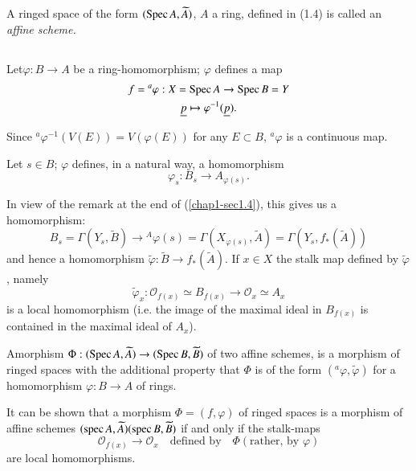 A ringed space of the form $(\operatorname{Spec} A,\widetilde{A})$, $A$ a ring,
defined in (1.4) is called an {\em affine scheme.}

\subsection{}\label{chap1-sec1.6.1}%

Let\pageoriginale $\varphi:B\to A$ be a ring-homomorphism; $\varphi$
defines a map
\begin{gather*}
f={}^{a}\varphi:X=\operatorname{Spec} A\to \operatorname{Spec} B=Y\\
\underline{p}\mapsto \varphi^{-1}(\underline{p}).
\end{gather*}

Since ${}^{a}\varphi^{-1}(V(E))=V(\varphi(E))$ for any $E\subset B$,
${}^{a}\varphi$ is a continuous map.

Let $s\in B$; $\varphi$ defines, in a natural way, a homomorphism
$$
\varphi_{s}:B_{s}\to A_{\varphi(s)}.
$$

In view of the remark at the end of (\ref{chap1-sec1.4}), this gives
us a homomorphism:
$$
B_{s}=\Gamma(Y_{s},\widetilde{B})\to
{}^{A}\varphi(s)=\Gamma(X_{\varphi(s)},\widetilde{A})=\Gamma(Y_{s},f_{\ast}(\widetilde{A})) 
$$
and hence a homomorphism $\widetilde{\varphi}:\widetilde{B}\to
f_{\ast}(\widetilde{A})$. If $x\in X$ the stalk map defined by
$\widetilde{\varphi}$, namely
$$
\widetilde{\varphi}_{x}:\mathscr{O}_{f(x)}\simeq B_{f(x)}\to
\mathscr{O}_{x}\simeq A_{x}
$$
is a local homomorphism (i.e. the image of the maximal ideal in
$B_{f(x)}$ is contained in the maximal ideal of $A_{x}$).

\setcounter{defin}{1}
\begin{defin}\label{chap1-def1.6.2}
A\pageoriginale morphism $\Phi:(\operatorname{Spec} A,\widetilde{A})\to (\operatorname{Spec}
B,\widetilde{B})$ of two affine schemes, is a morphism of ringed
spaces with the additional property that $\Phi$ is of the form
$({}^{a}\varphi,\widetilde{\varphi})$ for a homomorphism $\varphi:B\to
A$ of rings.
\end{defin}

It can be shown that a morphism $\Phi=(f,\varphi)$ of ringed spaces is
a morphism of affine schemes $(\operatorname{spec} A,\widetilde{A})(\operatorname{spec}
B,\widetilde{B})$ if and only if the stalk-maps
$$
\mathscr{O}_{f(x)}\to \mathscr{O}_{x}\quad\text{defined by}\quad
\Phi(\text{rather, by }\varphi)
$$
are local homomorphisms.

